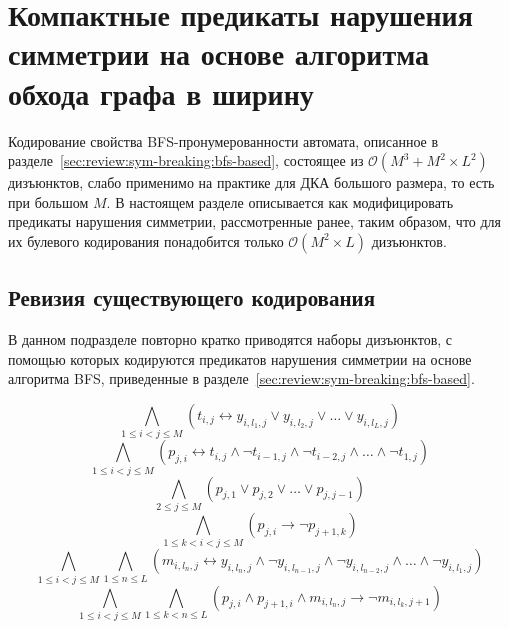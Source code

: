 
\section{Компактные предикаты нарушения симметрии на основе алгоритма обхода графа в ширину} 
\label{sec:space:tight}

Кодирование свойства BFS-пронумерованности автомата, описанное в разделе~\ref{sec:review:sym-breaking:bfs-based}, состоящее из $\mathcal{O}\left(M^{3} + M^{2} \times L^{2}\right)$ дизъюнктов, слабо применимо на практике для ДКА большого размера, то есть при большом $M$. 
В настоящем разделе описывается как модифицировать предикаты нарушения симметрии, рассмотренные ранее, таким образом, что для их булевого кодирования понадобится только $\mathcal{O}\left(M^{2} \times L\right)$ дизъюнктов.


\subsection{Ревизия существующего кодирования}
\label{sec:space:tight:review}

В данном подразделе повторно кратко приводятся наборы дизъюнктов, с помощью которых кодируются предикатов нарушения симметрии на основе алгоритма BFS, приведенные в разделе~\ref{sec:review:sym-breaking:bfs-based}.

\begin{equation}
\label{eq:t-def}
  \bigwedge_{1 \leq i < j \leq M} \left(t_{i,j} \leftrightarrow y_{i,l_{1},j} \vee y_{i,l_{2},j} \vee \ldots \vee y_{i,l_{L},j} \right)
\end{equation}
%
\begin{equation}
\label{eq:p-def}
  \bigwedge_{1 \leq i < j \leq M} \left(p_{j,i} \leftrightarrow t_{i,j} \wedge \neg t_{i - 1,j} \wedge \neg t_{i - 2, j} \wedge \ldots \wedge \neg t_{1,j}\right)
\end{equation}
%
\begin{equation}
\label{eq:p-alo}
  \bigwedge_{2 \leq j \leq M} \left(p_{j,1} \vee p_{j,2} \vee \ldots \vee p_{j,j - 1}\right)
\end{equation}
%
\begin{equation}
\label{eq:p-order}
  \bigwedge_{1 \leq k < i < j \leq M} \left(p_{j,i} \rightarrow \neg p_{j + 1, k}\right)
\end{equation}
%
\begin{equation}
\label{eq:m-def}
  \bigwedge_{1 \leq i < j \leq M} \bigwedge_{1 \leq n \leq L} \left(m_{i,l_{n},j} \leftrightarrow y_{i,l_{n},j} \wedge \neg y_{i,l_{n - 1}, j} \wedge \neg y_{i,l_{n - 2}, j} \wedge \ldots \wedge \neg y_{i,l_{1},j} \right)
\end{equation}
%
\begin{equation}
\label{eq:m-order}
  \bigwedge_{1 \leq i < j \leq M} \bigwedge_{1 \leq k < n \leq L} \left(p_{j,i} \wedge p_{j + 1, i} \wedge m_{i,l_{n}, j} \rightarrow \neg m_{i, l_{k}, j + 1}\right)
\end{equation}

